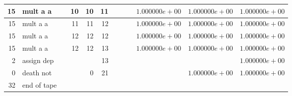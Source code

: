 \documentclass{article}
\begin{document}
\begin{tabular}{|r|l|r|r|r|r||r|r||r|r|r|r|}
15 & mult a a & & 10 & 10 & 11 & & & &$ 1.000000e+00 $&$ 1.000000e+00 $&$ 1.000000e+00 $\\ \hline 
15 & mult a a & & 11 & 11 & 12 & & & &$ 1.000000e+00 $&$ 1.000000e+00 $&$ 1.000000e+00 $\\ \hline 
15 & mult a a & & 12 & 12 & 12 & & & &$ 1.000000e+00 $&$ 1.000000e+00 $&$ 1.000000e+00 $\\ \hline 
15 & mult a a & & 12 & 12 & 13 & & & &$ 1.000000e+00 $&$ 1.000000e+00 $&$ 1.000000e+00 $\\ \hline 
2 & assign dep & & & & 13 & & & & & &$ 1.000000e+00 $\\ \hline 
0 & death not & & & 0 & 21 & & & & &$ 1.000000e+00 $&$ 1.000000e+00 $\\ \hline 
 32 & end of tape & & & & & & & & & &  \\ \hline 
\end{tabular}
\end{document}

